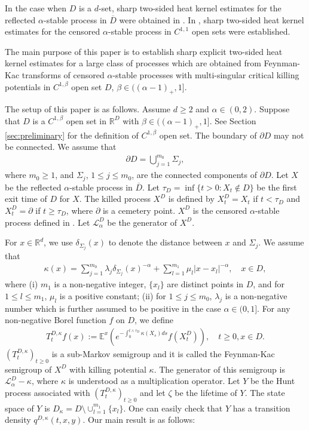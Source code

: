 \documentclass[12pt,a4paper]{amsart}
\numberwithin{equation}{section}
\theoremstyle{plain}
\newcommand{\Si}{\Sigma}
\newcommand{\mb}{\mathbb}
\newcommand{\R}{\mathbb{R}}
\newcommand{\1}{\mathbbm{1}}
\begin{document}
 In the case when $D$ is a $d$-set, sharp two-sided heat kernel estimates for the reflected $\alpha$-stable process in $\overline{D}$ were  obtained in \cite{CK03}. In \cite{CKS10b}, sharp two-sided heat kernel estimates for the censored
 $\alpha$-stable process in $C^{1, 1}$ open sets were established.

The main purpose of this paper is to establish sharp explicit 
two-sided heat kernel estimates 
for a large class of processes which are 
obtained from Feynman-Kac transforms of censored $\alpha$-stable processes with multi-singular critical killing potentials
in $C^{1, \beta}$ open set $D$, $\beta \in ((\alpha-1)_+,1]$.  

The setup of this paper is as follows. Assume $d\ge 2$ and $\alpha\in (0, 2)$. Suppose that $D$ is a $C^{1, \beta}$
open set in $\R^D$ with $\beta \in ((\alpha-1)_+,1]$.  See Section \ref{sec:preliminary} for the definition of $C^{1,\beta}$ open set. The boundary of $\partial D$ may not be connected. We assume
that 
\begin{align}\label{assumption:boundary}
    \partial D = \bigcup_{j=1}^{m_0} \Si_j,
\end{align}
where $m_0\ge 1$,  and $\Si_j$, $1\le j\le m_0$, are the connected components of $\partial D$. 
Let $X$ be the reflected $\alpha$-stable process in $\overline{D}$. Let $\tau_D=\inf\{t>0: X_t\notin D\}$ be the
first exit time of $D$ for $X$.  The killed process $X^D$ is defined by $X^D_t=X_t$ if $t<\tau_D$ and $X^D_t=\partial$
if $t\ge \tau_D$, where $\partial$ is a cemetery point. $X^D$ is the censored $\alpha$-stable process defined in
\cite{BBC03}.  Let $\mathcal{L}_{\alpha}^D$ be the generator of $X^D$. 

For $x\in \R^d$, we use $\delta_{\Si_j}(x)$ to denote the distance between $x$ and $\Si_j$. We assume that
\begin{align}\label{def:killing function}
    \kappa(x) = \sum_{j=1}^{m_0} \lambda_{j} \delta_{\Sigma_{j}}(x)^{-\alpha} + \sum_{l=1}^{m_1} \mu_l |x-x_l|^{-\alpha},
    \quad x\in D,
\end{align}
where (i) 
$m_1$ is a non-negative integer, $\{x_l\}$ are distinct points in $D$, 
 and for $1\le l\le m_1$, $\mu_l$ is a positive constant; (ii) for $1\le j\le m_0$,
$\lambda_j$ is a non-negative number which is further assumed to be positive in the case $\alpha\in (0, 1]$. 
For any non-negative Borel function $f$ on $D$, we define
\begin{align}\label{e:semig}
T_t^{D, \kappa} f(x):=\mb E^x\left(e^{-\int^{t\wedge \tau_D}_0\kappa(X_s)ds}f(X^D_t)\right), \quad t\ge 0, x\in D.
\end{align}
$(T^{D, \kappa}_t)_{t\ge 0}$ is a sub-Markov semigroup and it is called the Feynman-Kac semigroup of $X^D$ with killing potential $\kappa$. The generator of this semigroup is $\mathcal{L}_{\alpha}^D-\kappa$, where $\kappa$ is understood as a multiplication operator. Let $Y$ be the Hunt process associated with 
$(T^{D, \kappa}_t)_{t\ge 0}$ and let $\zeta$ be the lifetime of $Y$. The state space of 
$Y$ is $D_{\kappa}=D\setminus\cup^{m_1}_{l=1}\{x_l\}$. One can easily check that $Y$ has a transition density $q^{D, \kappa}(t, x, y)$. 
Our main result is as follows:
\end{document}
